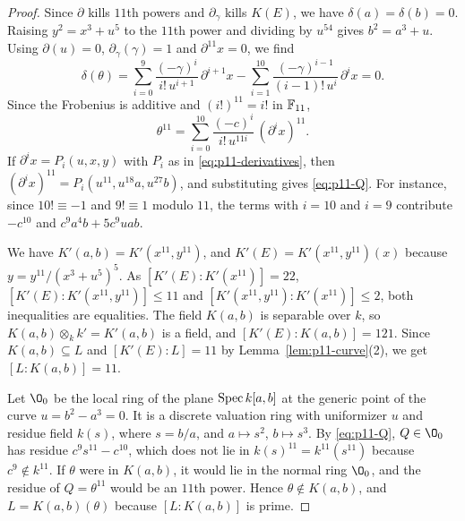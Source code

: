 \begin{proof}
Since $\partial$ kills $11$th powers and $\partial_\gamma$ kills $K(E)$, we have $\delta(a) = \delta(b) = 0$.
Raising $y^2 = x^3+u^5$ to the $11$th power and dividing by $u^{54}$ gives $b^2 = a^3+u$.
Using $\partial(u) = 0$, $\partial_\gamma(\gamma) = 1$ and $\partial^{11}x = 0$, we find
\[
  \delta(\theta) = \sum_{i=0}^{9}\frac{(-\gamma)^i}{i!\,u^{i+1}}\,\partial^{i+1}x-\sum_{i=1}^{10}\frac{(-\gamma)^{i-1}}{(i-1)!\,u^{i}}\,\partial^{i}x = 0.
\]
Since the Frobenius is additive and $(i!)^{11} = i!$ in $\mathbb{F}_{11}$,
\[
  \theta^{11} = \sum_{i=0}^{10}\frac{(-c)^i}{i!\,u^{11i}}\,(\partial^ix)^{11}.
\]
If $\partial^ix = P_i(u,x,y)$ with $P_i$ as in \eqref{eq:p11-derivatives}, then $(\partial^ix)^{11} = P_i(u^{11},u^{18}a,u^{27}b)$, and substituting gives \eqref{eq:p11-Q}.
For instance, since $10!\equiv -1$ and $9!\equiv 1$ modulo $11$, the terms with $i = 10$ and $i = 9$ contribute $-c^{10}$ and $c^9a^4b+5c^9uab$.

We have $K'(a,b) = K'(x^{11},y^{11})$, and $K'(E) = K'(x^{11},y^{11})(x)$ because $y = y^{11}/(x^3+u^5)^5$.
As $[K'(E):K'(x^{11})] = 22$, $[K'(E):K'(x^{11},y^{11})]\leq 11$ and $[K'(x^{11},y^{11}):K'(x^{11})]\leq 2$, both inequalities are equalities.
The field $K(a,b)$ is separable over $k$, so $K(a,b)\otimes_kk' = K'(a,b)$ is a field, and $[K'(E):K(a,b)] = 121$.
Since $K(a,b)\subseteq L$ and $[K'(E):L] = 11$ by Lemma~\ref{lem:p11-curve}(2), we get $[L:K(a,b)] = 11$.

Let $\O_0$ be the local ring of the plane $\operatorname{Spec} k[a,b]$ at the generic point of the curve $u = b^2-a^3 = 0$.
It is a discrete valuation ring with uniformizer $u$ and residue field $k(s)$, where $s = b/a$, and $a\mapsto s^2$, $b\mapsto s^3$.
By \eqref{eq:p11-Q}, $Q\in\O_0$ has residue $c^9s^{11}-c^{10}$, which does not lie in $k(s)^{11} = k^{11}(s^{11})$ because $c^9\notin k^{11}$.
If $\theta$ were in $K(a,b)$, it would lie in the normal ring $\O_0$, and the residue of $Q = \theta^{11}$ would be an $11$th power.
Hence $\theta\notin K(a,b)$, and $L = K(a,b)(\theta)$ because $[L:K(a,b)]$ is prime.
\end{proof}

